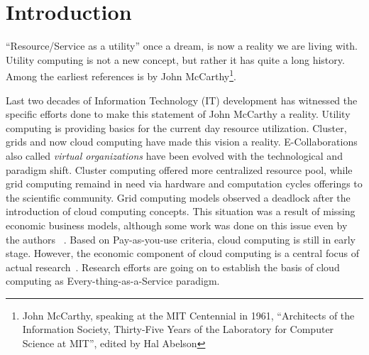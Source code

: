 \documentclass[]{article}
\begin{document}
\section{Introduction}

``Resource/Service as a utility'' once a dream, is now a reality we are living with. Utility computing is not a new concept, but rather it has quite a long history. Among the earliest references is by John McCarthy\footnote{John McCarthy, speaking at the MIT Centennial in 1961, ``Architects of
the Information Society, Thirty-Five Years of the Laboratory for Computer
Science at MIT'', edited by Hal Abelson}.

Last two decades of Information Technology (IT) development has witnessed the  specific efforts done to make this statement of John McCarthy a reality. Utility computing is providing basics for the current day resource utilization. Cluster, grids and now cloud computing have made this vision a reality. E-Collaborations also called \emph{virtual organizations} have been evolved with the technological and paradigm shift. Cluster computing offered more centralized resource pool, while grid computing remaind in need via hardware and computation cycles offerings to the scientific community. Grid computing models observed a deadlock after the introduction of cloud computing concepts. This situation was a result of missing economic business models, although some work was done on this issue even by the authors~ \cite{weishaeupl_business_2005,schikuta_business_2005,weishaeupl_towards_2004,weishaeupl_gset:_2006}. Based on Pay-as-you-use criteria, cloud computing is still in early stage. However, the economic component of cloud computing is a central focus of actual research~\cite{cs3939,cs3713,machschikutaIIWAS12}. Research efforts are going on to establish the basis of cloud computing as Every-thing-as-a-Service paradigm.
\end{document}
